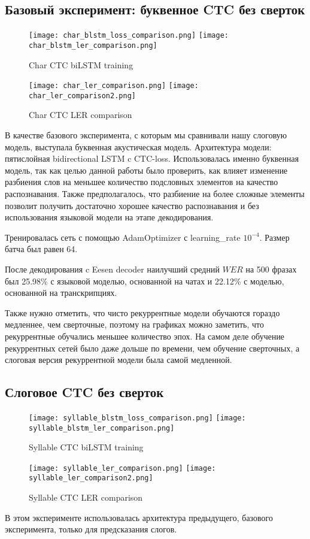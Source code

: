 \documentclass[a4paper,14pt]{extarticle}
\begin{document}
\subsection{Базовый эксперимент: буквенное CTC без сверток}
\begin{figure}[!h]
	\texttt{[image: char\_blstm\_loss\_comparison.png]}%
	\texttt{[image: char\_blstm\_ler\_comparison.png]}
	\caption{Char CTC biLSTM training}
	\label{char_bilstm_train}
\end{figure}
\begin{figure}[!h]
	\texttt{[image: char\_ler\_comparison.png]}%
	\texttt{[image: char\_ler\_comparison2.png]}
	\caption{Char CTC LER comparison}
	\label{char_ler_comparison}
\end{figure}
В качестве базового эксперимента, с которым мы сравнивали нашу слоговую модель, выступала буквенная акустическая модель. Архитектура модели: пятислойная bidirectional LSTM c CTC-loss. Использовалась именно буквенная модель, так как целью данной работы было проверить, как влияет изменение разбиения слов на меньшее количество подсловных элементов на качество распознавания. Также предполагалось, что разбиение на более сложные элементы позволит получить достаточно хорошее качество распознавания и без использования языковой модели на этапе декодирования.

Тренировалась сеть с помощью AdamOptimizer с learning\_rate $10^{-4}$. Размер батча был равен 64. 

После декодирования c Eesen decoder наилучший средний $WER$ на 500 фразах был 25.98\% с языковой моделью, основанной на чатах и 22.12\% с моделью, основанной на транскрипциях. 

Также нужно отметить, что чисто рекуррентные модели обучаются гораздо медленнее, чем сверточные, поэтому на графиках можно заметить, что рекуррентные обучались меньшее количество эпох. На самом деле обучение рекуррентных сетей было даже дольше по времени, чем обучение сверточных, а слоговая версия рекуррентной модели была самой медленной.

\subsection{Слоговое CTC без сверток}
\begin{figure}[!ht]
	\texttt{[image: syllable\_blstm\_loss\_comparison.png]}%
	\texttt{[image: syllable\_blstm\_ler\_comparison.png]}
	\caption{Syllable CTC biLSTM training}
	\label{syllable_bilstm_train}
\end{figure}
\begin{figure}[!h]
	\texttt{[image: syllable\_ler\_comparison.png]}%
	\texttt{[image: syllable\_ler\_comparison2.png]}
	\caption{Syllable CTC LER comparison}
	\label{syllable_ler_comparison}
\end{figure}
В этом эксперименте использовалась архитектура предыдущего, базового эксперимента, только для предсказания слогов. 
\end{document}

